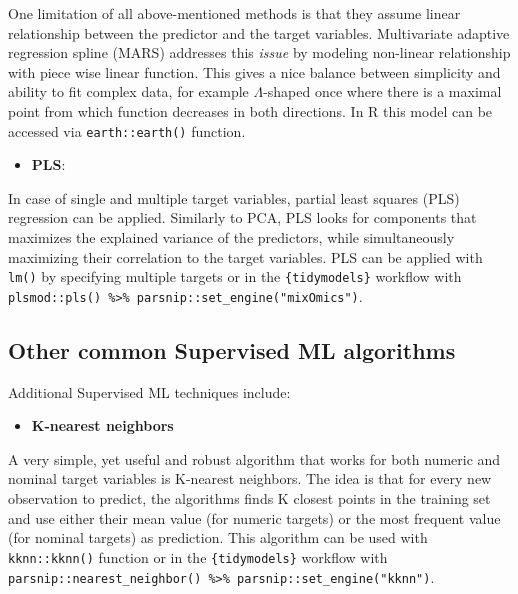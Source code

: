 \documentclass[
]{krantz}
\providecommand{\tightlist}{%
  \setlength{\itemsep}{0pt}\setlength{\parskip}{0pt}}
\begin{document}
One limitation of all above-mentioned methods is that they assume linear relationship between the predictor and the target variables. Multivariate adaptive regression spline (MARS) addresses this \emph{issue} by modeling non-linear relationship with piece wise linear function. This gives a nice balance between simplicity and ability to fit complex data, for example \(\Lambda\)-shaped once where there is a maximal point from which function decreases in both directions. In R this model can be accessed via \texttt{earth::earth()} function.

\begin{itemize}
\tightlist
\item
  \textbf{PLS}:
\end{itemize}

In case of single and multiple target variables, partial least squares (PLS) regression can be applied. Similarly to PCA, PLS looks for components that maximizes the explained variance of the predictors, while simultaneously maximizing their correlation to the target variables. PLS can be applied with \texttt{lm()} by specifying multiple targets or in the \texttt{\{tidymodels\}} workflow with \texttt{plsmod::pls()\ \%\textgreater{}\%\ parsnip::set\_engine("mixOmics")}.

\hypertarget{other-common-supervised-ml-algorithms}{%
\subsection{Other common Supervised ML algorithms}\label{other-common-supervised-ml-algorithms}}

Additional Supervised ML techniques include:

\begin{itemize}
\tightlist
\item
  \textbf{K-nearest neighbors}
\end{itemize}

A very simple, yet useful and robust algorithm that works for both numeric and nominal target variables is K-nearest neighbors. The idea is that for every new observation to predict, the algorithms finds K closest points in the training set and use either their mean value (for numeric targets) or the most frequent value (for nominal targets) as prediction. This algorithm can be used with \texttt{kknn::kknn()} function or in the \texttt{\{tidymodels\}} workflow with \texttt{parsnip::nearest\_neighbor()\ \%\textgreater{}\%\ parsnip::set\_engine("kknn")}.
\end{document}
